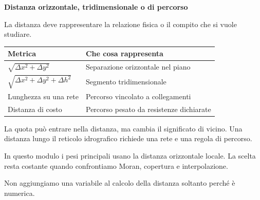 \documentclass[12pt,aspectratio=1610]{beamer}
\newcommand{\PBody}[1]{\par{\fontsize{11.3}{14.8}\selectfont #1\par}}
\newcommand{\PSmall}[1]{\par{\fontsize{9.8}{13.1}\selectfont #1\par}}
\newcommand{\PInfo}[1]{%
\begin{tcolorbox}[enhanced,arc=1.6mm,boxrule=.55pt,colback=GeoTint,
 colframe=Rule!80!Classical,left=2.3mm,right=2.3mm,top=2mm,bottom=2mm,
 before skip=1mm,after skip=1mm]
\PSmall{#1}\end{tcolorbox}}
\begin{document}
\begin{frame}[plain]\hypertarget{slide21}{}
\begin{lrbox}{\TitleBox}
\begin{minipage}[t]{17.7cm}\raggedright\color{Ink}\fontsize{11.3}{14.8}\selectfont
\color{Navy}\bfseries\fontsize{20.6}{24.5}\selectfont Distanza orizzontale, tridimensionale o di percorso
\end{minipage}\end{lrbox}

\begin{lrbox}{\RecallBox}
\begin{minipage}[t]{14.3cm}\raggedright\color{Ink}\fontsize{11.3}{14.8}\selectfont
\fontsize{10.3}{13.8}\selectfont La distanza deve rappresentare la relazione fisica o il compito che si vuole studiare.
\end{minipage}\end{lrbox}

\begin{lrbox}{\PilotLeftBox}
\begin{minipage}[t]{10.05cm}\raggedright\color{Ink}\fontsize{11.3}{14.8}\selectfont
{\fontsize{10.2}{13.1}\selectfont\renewcommand{\arraystretch}{1.45}\begin{tabular}{@{}p{4.1cm}p{4.9cm}@{}}\toprule
\textbf{Metrica} & \textbf{Che cosa rappresenta}\\\midrule
$\sqrt{\Delta x^2+\Delta y^2}$ & Separazione orizzontale nel piano\\
$\sqrt{\Delta x^2+\Delta y^2+\Delta h^2}$ & Segmento tridimensionale\\
Lunghezza su una rete & Percorso vincolato a collegamenti\\
Distanza di costo & Percorso pesato da resistenze dichiarate\\
\bottomrule\end{tabular}}

\end{minipage}\end{lrbox}

\begin{lrbox}{\PilotRightBox}
\begin{minipage}[t]{7.55cm}\raggedright\color{Ink}\fontsize{11.3}{14.8}\selectfont
\PBody{La quota può entrare nella distanza, ma cambia il significato di vicino. Una distanza lungo il reticolo idrografico richiede una rete e una regola di percorso.}
\vspace{2.5mm}
\PInfo{In questo modulo i pesi principali usano la distanza orizzontale locale. La scelta resta costante quando confrontiamo Moran, copertura e interpolazione.}
\PBody{Non aggiungiamo una variabile al calcolo della distanza soltanto perché è numerica.}
\vspace{2.5mm}


\end{minipage}
\end{lrbox}
\end{frame}
\end{document}

